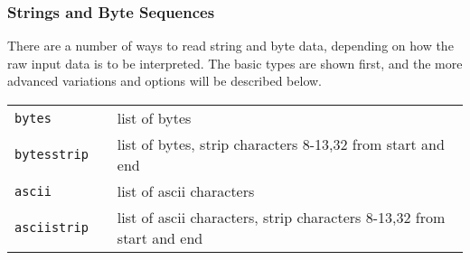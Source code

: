 \subsubsection{Strings and Byte Sequences}
There are a number of ways to read string and byte data, depending on
how the raw input data is to be interpreted.  The basic types are
shown first, and the more advanced variations and options will be
described below.
\begin{leftbar}
\begin{tabular}{p{2cm}p{2cm}p{8cm}}
  \texttt{bytes}      && list of bytes\\
  \texttt{bytesstrip} && list of bytes, strip characters 8-13,32 from start and end\\
  \texttt{ascii}      && list of ascii characters\\
  \texttt{asciistrip} && list of ascii characters, strip characters 8-13,32 from start and end\\
\end{tabular}
\end{leftbar}


